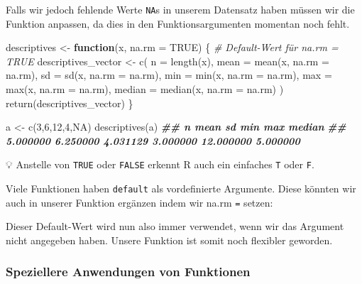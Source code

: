 \documentclass[
]{article}
\newenvironment{Shaded}{\begin{snugshade}}{\end{snugshade}}
\newcommand{\AttributeTok}[1]{\textcolor[rgb]{0.77,0.63,0.00}{#1}}
\newcommand{\CommentTok}[1]{\textcolor[rgb]{0.56,0.35,0.01}{\textit{#1}}}
\newcommand{\ConstantTok}[1]{\textcolor[rgb]{0.00,0.00,0.00}{#1}}
\newcommand{\ControlFlowTok}[1]{\textcolor[rgb]{0.13,0.29,0.53}{\textbf{#1}}}
\newcommand{\DecValTok}[1]{\textcolor[rgb]{0.00,0.00,0.81}{#1}}
\newcommand{\DocumentationTok}[1]{\textcolor[rgb]{0.56,0.35,0.01}{\textbf{\textit{#1}}}}
\newcommand{\FunctionTok}[1]{\textcolor[rgb]{0.00,0.00,0.00}{#1}}
\newcommand{\NormalTok}[1]{#1}
\newcommand{\OtherTok}[1]{\textcolor[rgb]{0.56,0.35,0.01}{#1}}
\begin{document}
Falls wir jedoch fehlende Werte \texttt{NA}s in unserem Datensatz haben müssen wir die Funktion anpassen, da dies in den Funktionsargumenten momentan noch fehlt.

\begin{Shaded}
\begin{Highlighting}[]
\NormalTok{descriptives }\OtherTok{\textless{}{-}} \ControlFlowTok{function}\NormalTok{(x, }\AttributeTok{na.rm =} \ConstantTok{TRUE}\NormalTok{) \{ }\CommentTok{\# Default{-}Wert für \textquotesingle{}na.rm\textquotesingle{} = TRUE}
\NormalTok{  descriptives\_vector }\OtherTok{\textless{}{-}} \FunctionTok{c}\NormalTok{(}
    \AttributeTok{n =} \FunctionTok{length}\NormalTok{(x),}
    \AttributeTok{mean =} \FunctionTok{mean}\NormalTok{(x, }\AttributeTok{na.rm =}\NormalTok{ na.rm), }
    \AttributeTok{sd =} \FunctionTok{sd}\NormalTok{(x, }\AttributeTok{na.rm =}\NormalTok{ na.rm),     }
    \AttributeTok{min =} \FunctionTok{min}\NormalTok{(x, }\AttributeTok{na.rm =}\NormalTok{ na.rm),   }
    \AttributeTok{max =} \FunctionTok{max}\NormalTok{(x, }\AttributeTok{na.rm =}\NormalTok{ na.rm),}
    \AttributeTok{median =} \FunctionTok{median}\NormalTok{(x, }\AttributeTok{na.rm =}\NormalTok{ na.rm)}
\NormalTok{  )}
  \FunctionTok{return}\NormalTok{(descriptives\_vector)}
\NormalTok{\}}

\NormalTok{a }\OtherTok{\textless{}{-}} \FunctionTok{c}\NormalTok{(}\DecValTok{3}\NormalTok{,}\DecValTok{6}\NormalTok{,}\DecValTok{12}\NormalTok{,}\DecValTok{4}\NormalTok{,}\ConstantTok{NA}\NormalTok{)}
\FunctionTok{descriptives}\NormalTok{(a)}
\DocumentationTok{\#\#         n      mean        sd       min       max    median }
\DocumentationTok{\#\#  5.000000  6.250000  4.031129  3.000000 12.000000  5.000000}
\end{Highlighting}
\end{Shaded}

💡 Anstelle von \texttt{TRUE} oder \texttt{FALSE} erkennt R auch ein einfaches \texttt{T} oder \texttt{F}.

Viele Funktionen haben \texttt{default} als vordefinierte Argumente. Diese könnten wir auch in unserer Funktion ergänzen indem wir na.rm \texttt{=} setzen:

Dieser Default-Wert wird nun also immer verwendet, wenn wir das Argument nicht angegeben haben. Unsere Funktion ist somit noch flexibler geworden.

\hypertarget{speziellere-anwendungen-von-funktionen}{%
\subsubsection{Speziellere Anwendungen von Funktionen}\label{speziellere-anwendungen-von-funktionen}}
\end{document}
